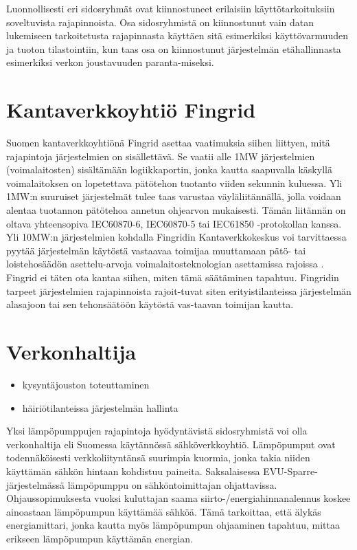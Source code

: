 Luonnollisesti eri sidosryhmät ovat kiinnostuneet erilaisiin käyttötarkoituksiin soveltuvista rajapinnoista. Osa sidosryhmistä on kiinnostunut vain datan lukemiseen tarkoitetusta rajapinnasta käyttäen sitä esimerkiksi käyttövarmuuden ja tuoton tilastointiin, kun taas osa on kiinnostunut järjestelmän etähallinnasta esimerkiksi verkon joustavuuden paranta-miseksi.

\section{Kantaverkkoyhtiö Fingrid}
  Suomen kantaverkkoyhtiönä Fingrid asettaa vaatimuksia siihen liittyen, mitä rajapintoja järjestelmien on sisällettävä. Se vaatii alle 1MW järjestelmien (voimalaitosten) sisältämään logiikkaportin, jonka kautta saapuvalla käskyllä voimalaitoksen on lopetettava pätötehon tuotanto viiden sekunnin kuluessa. Yli 1MW:n suuruiset järjestelmät tulee taas varustaa väyläliitännällä, jolla voidaan alentaa tuotannon pätötehoa annetun ohjearvon mukaisesti. Tämän liitännän on oltava yhteensopiva IEC60870-6, IEC60870-5 tai IEC61850 -protokollan kanssa. \parencite{VJV2018}
  Yli 10MW:n järjestelmien kohdalla Fingridin Kantaverkkokeskus voi tarvittaessa pyytää järjestelmän käytöstä vastaavaa toimijaa muuttamaan pätö- tai loistehosäädön asettelu-arvoja voimalaitosteknologian asettamissa rajoissa \parencite{VJV2018}. Fingrid ei täten ota kantaa siihen, miten tämä säätäminen tapahtuu. Fingridin tarpeet järjestelmien rajapinnoista rajoit-tuvat siten erityistilanteissa järjestelmän alasajoon tai sen tehonsäätöön käytöstä vas-taavan toimijan kautta.

\section{Verkonhaltija}
  \begin{itemize}
    \item kysyntäjouston toteuttaminen
    \item häiriötilanteissa järjestelmän hallinta
  \end{itemize}

  Yksi lämpöpumppujen rajapintoja hyödyntävistä sidosryhmistä voi olla verkonhaltija eli Suomessa käytännössä sähköverkkoyhtiö. Lämpöpumput ovat todennäköisesti verkkoliityntänsä suurimpia kuormia, jonka takia niiden käyttämän sähkön hintaan kohdistuu paineita. Saksalaisessa EVU-Sparre-järjestelmässä lämpöpumppu on sähköntoimittajan ohjattavissa. Ohjaussopimuksesta vuoksi kuluttajan saama siirto-/energiahinnanalennus koskee ainoastaan lämpöpumpun käyttämää sähköä. Tämä tarkoittaa, että älykäs energiamittari, jonka kautta myös lämpöpumpun ohjaaminen tapahtuu, mittaa erikseen lämpöpumpun käyttämän energian.

